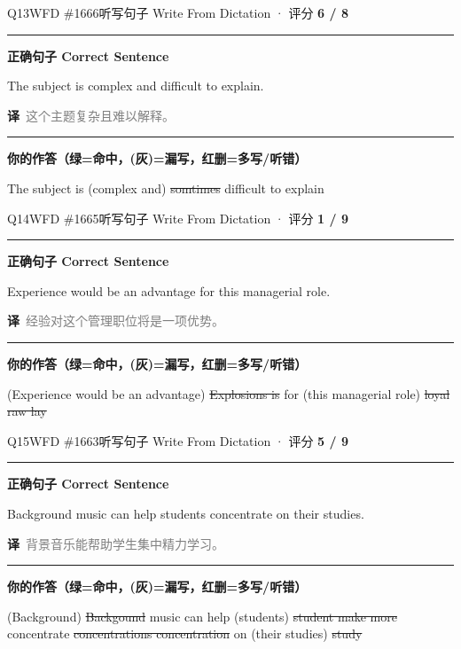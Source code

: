 \documentclass[11pt]{article}
\newcommand{\ptesub}[1]{%
  \par\needspace{2\baselineskip}\smallskip
  {\color{cAccent}\rule[-0.2ex]{3pt}{1.05em}}\hspace{6pt}%
  {\bfseries\color{cHead}#1}\par\nopagebreak\smallskip}
\newcommand{\zh}[1]{{\footnotesize\textcolor{cNote}{\textbf{译}}\ \textcolor{gray}{#1}}}
\newcommand{\lhit}[1]{{\color{cFix}#1}}                           %
\newcommand{\lmiss}[1]{{\color{cWrong}\sout{#1}}}                 %
\begin{document}
\begin{qblock}{Q13\quad WFD \#1666}{听写句子 Write From Dictation · 评分 \textcolor{cAccent}{\bfseries 6 / 8}}
\ptesub{正确句子 Correct Sentence}
\begin{promptbox}
The subject is complex and difficult to explain.
\end{promptbox}
\zh{这个主题复杂且难以解释。}
\ptesub{你的作答（{\color{cFix}绿=命中}，{\color{gray}(灰)=漏写}，{\color{cWrong}红删=多写/听错}）}
{\small\lhit{The subject is} {\color{gray}(complex and)} \lmiss{somtimes} \lhit{difficult to explain}}
\end{qblock}

\begin{qblock}{Q14\quad WFD \#1665}{听写句子 Write From Dictation · 评分 \textcolor{cAccent}{\bfseries 1 / 9}}
\ptesub{正确句子 Correct Sentence}
\begin{promptbox}
Experience would be an advantage for this managerial role.
\end{promptbox}
\zh{经验对这个管理职位将是一项优势。}
\ptesub{你的作答（{\color{cFix}绿=命中}，{\color{gray}(灰)=漏写}，{\color{cWrong}红删=多写/听错}）}
{\small{\color{gray}(Experience would be an advantage)} \lmiss{Explosions is} \lhit{for} {\color{gray}(this managerial role)} \lmiss{loyal raw lay}}
\end{qblock}

\begin{qblock}{Q15\quad WFD \#1663}{听写句子 Write From Dictation · 评分 \textcolor{cAccent}{\bfseries 5 / 9}}
\ptesub{正确句子 Correct Sentence}
\begin{promptbox}
Background music can help students concentrate on their studies.
\end{promptbox}
\zh{背景音乐能帮助学生集中精力学习。}
\ptesub{你的作答（{\color{cFix}绿=命中}，{\color{gray}(灰)=漏写}，{\color{cWrong}红删=多写/听错}）}
{\small{\color{gray}(Background)} \lmiss{Backgound} \lhit{music can help} {\color{gray}(students)} \lmiss{student make more} \lhit{concentrate} \lmiss{concentrations concentration} \lhit{on} {\color{gray}(their studies)} \lmiss{study}}
\end{qblock}
\end{document}

